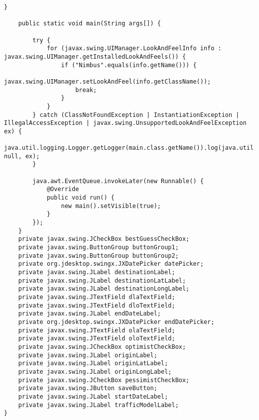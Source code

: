 \begin{lstlisting}[caption= main.java]
    }                                          

    public static void main(String args[]) {
        
        try {
            for (javax.swing.UIManager.LookAndFeelInfo info : javax.swing.UIManager.getInstalledLookAndFeels()) {
                if ("Nimbus".equals(info.getName())) {
                    javax.swing.UIManager.setLookAndFeel(info.getClassName());
                    break;
                }
            }
        } catch (ClassNotFoundException | InstantiationException | IllegalAccessException | javax.swing.UnsupportedLookAndFeelException ex) {
            java.util.logging.Logger.getLogger(main.class.getName()).log(java.util.logging.Level.SEVERE, null, ex);
        }
        
        java.awt.EventQueue.invokeLater(new Runnable() {
            @Override
            public void run() {
                new main().setVisible(true);
            }
        });
    }                    
    private javax.swing.JCheckBox bestGuessCheckBox;
    private javax.swing.ButtonGroup buttonGroup1;
    private javax.swing.ButtonGroup buttonGroup2;
    private org.jdesktop.swingx.JXDatePicker datePicker;
    private javax.swing.JLabel destinationLabel;
    private javax.swing.JLabel destinationLatLabel;
    private javax.swing.JLabel destinationLongLabel;
    private javax.swing.JTextField dlaTextField;
    private javax.swing.JTextField dloTextField;
    private javax.swing.JLabel endDateLabel;
    private org.jdesktop.swingx.JXDatePicker endDatePicker;
    private javax.swing.JTextField olaTextField;
    private javax.swing.JTextField oloTextField;
    private javax.swing.JCheckBox optimistCheckBox;
    private javax.swing.JLabel originLabel;
    private javax.swing.JLabel originLatLabel;
    private javax.swing.JLabel originLongLabel;
    private javax.swing.JCheckBox pessimistCheckBox;
    private javax.swing.JButton saveButton;
    private javax.swing.JLabel startDateLabel;
    private javax.swing.JLabel trafficModelLabel;                  
}

\end{lstlisting}

